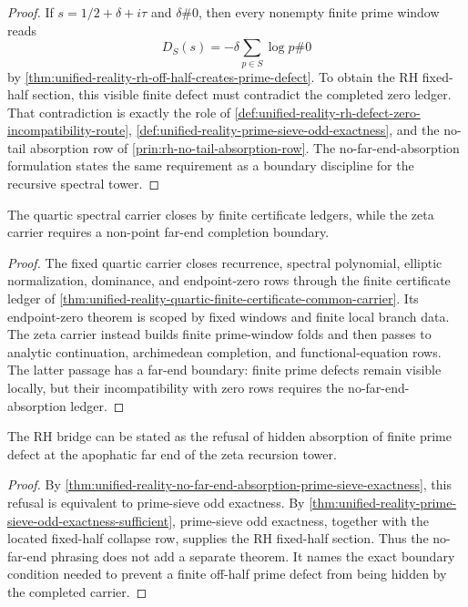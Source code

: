 \begin{proof}
If $s=1/2+\delta+i\tau$ and $\delta\#0$, then every nonempty finite prime
window reads
$$
D_S(s)
=
-\delta\sum_{p\in S}\log p
\#0
$$
by \autoref{thm:unified-reality-rh-off-half-creates-prime-defect}.  To
obtain the RH fixed-half section, this visible finite defect must
contradict the completed zero ledger.  That contradiction is exactly the
role of
\autoref{def:unified-reality-rh-defect-zero-incompatibility-route},
\autoref{def:unified-reality-prime-sieve-odd-exactness}, and the no-tail
absorption row of \autoref{prin:rh-no-tail-absorption-row}.  The
no-far-end-absorption formulation states the same requirement as a
boundary discipline for the recursive spectral tower.
\end{proof}

\begin{theorem}
\label{thm:unified-reality-quartic-finite-closure-zeta-far-end-boundary}
The quartic spectral carrier closes by finite certificate ledgers, while
the zeta carrier requires a non-point far-end completion boundary.
\end{theorem}

\begin{proof}
The fixed quartic carrier closes recurrence, spectral polynomial,
elliptic normalization, dominance, and endpoint-zero rows through the
finite certificate ledger of
\autoref{thm:unified-reality-quartic-finite-certificate-common-carrier}.
Its endpoint-zero theorem is scoped by fixed windows and finite local
branch data.  The zeta carrier instead builds finite prime-window folds
and then passes to analytic continuation, archimedean completion, and
functional-equation rows.  The latter passage has a far-end boundary:
finite prime defects remain visible locally, but their incompatibility
with zero rows requires the no-far-end-absorption ledger.
\end{proof}

\begin{theorem}
\label{thm:unified-reality-no-far-end-formulation-rh-bridge}
The RH bridge can be stated as the refusal of hidden absorption of
finite prime defect at the apophatic far end of the zeta recursion tower.
\end{theorem}

\begin{proof}
By
\autoref{thm:unified-reality-no-far-end-absorption-prime-sieve-exactness},
this refusal is equivalent to prime-sieve odd exactness.  By
\autoref{thm:unified-reality-prime-sieve-odd-exactness-sufficient},
prime-sieve odd exactness, together with the located fixed-half collapse
row, supplies the RH fixed-half section.  Thus the no-far-end phrasing
does not add a separate theorem.  It names the exact boundary condition
needed to prevent a finite off-half prime defect from being hidden by
the completed carrier.
\end{proof}
